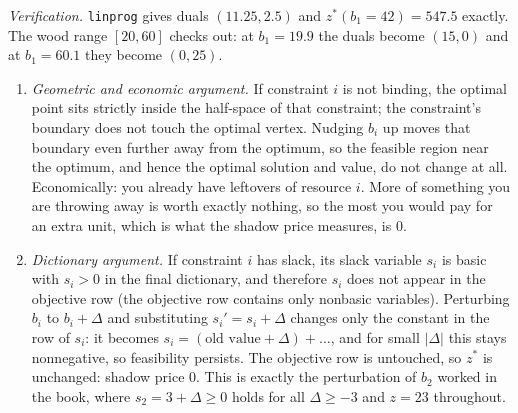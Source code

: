 \emph{Verification.} \texttt{linprog} gives duals $(11.25, 2.5)$ and $z^*(b_1 = 42) = 547.5$ exactly. The wood range $[20, 60]$ checks out: at $b_1 = 19.9$ the duals become $(15, 0)$ and at $b_1 = 60.1$ they become $(0, 25)$.


\begin{enumerate}
\item \emph{Geometric and economic argument.} If constraint $i$ is not binding, the optimal point sits strictly inside the half-space of that constraint; the constraint's boundary does not touch the optimal vertex. Nudging $b_i$ up moves that boundary even further away from the optimum, so the feasible region near the optimum, and hence the optimal solution and value, do not change at all. Economically: you already have leftovers of resource $i$. More of something you are throwing away is worth exactly nothing, so the most you would pay for an extra unit, which is what the shadow price measures, is $0$.
\item \emph{Dictionary argument.} If constraint $i$ has slack, its slack variable $s_i$ is basic with $s_i > 0$ in the final dictionary, and therefore $s_i$ does not appear in the objective row (the objective row contains only nonbasic variables). Perturbing $b_i$ to $b_i + \Delta$ and substituting $s_i' = s_i + \Delta$ changes only the constant in the row of $s_i$: it becomes $s_i = (\text{old value} + \Delta) + \dots$, and for small $|\Delta|$ this stays nonnegative, so feasibility persists. The objective row is untouched, so $z^*$ is unchanged: shadow price $0$. This is exactly the perturbation of $b_2$ worked in the book, where $s_2 = 3 + \Delta \ge 0$ holds for all $\Delta \ge -3$ and $z = 23$ throughout.
\end{enumerate}


